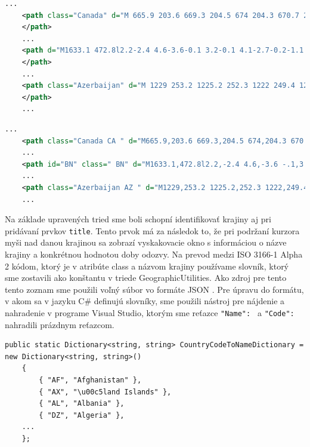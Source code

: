 \begin{lstlisting}[language={XML},caption={Ukážka kódu neupravenej SVG mapy.},label=alg:map_orig]
    ...
    <path class="Canada" d="M 665.9 203.6 669.3 204.5 674 204.3 670.7 206.9 668.7 207.3 663.2 204.6 662.6 202.5 665.1 200.6 665.9 203.6 Z">
    </path>
    ...
    <path d="M1633.1 472.8l2.2-2.4 4.6-3.6-0.1 3.2-0.1 4.1-2.7-0.2-1.1 2.2-2.8-3.3z" id="BN" name="Brunei Darussalam">
    </path>
    ...
    <path class="Azerbaijan" d="M 1229 253.2 1225.2 252.3 1222 249.4 1220.8 246.9 1221.8 246.8 1223.7 248.5 1226 248.5 1226.2 249.5 1229 253.2 Z">
    </path>
    ...
\end{lstlisting}

\begin{lstlisting}[language={XML},caption={Ukážka kódu upravenej SVG mapy.},label=alg:map_edited]
    ...
    <path class="Canada CA " d="M665.9,203.6 669.3,204.5 674,204.3 670.7,206.9 668.7,207.3 663.2,204.6 662.6,202.5 665.1,200.6 665.9,203.6Z"/>
    ...
    <path id="BN" class=" BN" d="M1633.1,472.8l2.2,-2.4 4.6,-3.6 -.1,3.2 -.1,4.1 -2.7,-.2 -1.1,2.2 -2.8,-3.3z" name="Brunei Darussalam"/>
    ...
    <path class="Azerbaijan AZ " d="M1229,253.2 1225.2,252.3 1222,249.4 1220.8,246.9 1221.8,246.8 1223.7,248.5H1226L1226.2,249.5 1229,253.2Z"/>
    ...
\end{lstlisting}


Na základe upravených tried sme boli schopní identifikovať krajiny aj pri pridávaní prvkov \lstinline{title}. Tento prvok má za následok to, že pri podržaní 
kurzora myši nad danou krajinou sa zobrazí vyskakovacie okno s informáciou o názve krajiny a konkrétnou hodnotou doby odozvy. Na prevod medzi ISO 3166-1 Alpha 2 kódom, 
ktorý je v atribúte class a názvom krajiny používame slovník, ktorý sme zostavili ako konštantu v triede GeographicUtilities. Ako zdroj pre tento tento zoznam 
sme použili voľný súbor vo formáte JSON \cite{country_codes}. Pre úpravu do formátu, v akom sa v jazyku C\# definujú slovníky, sme použili nástroj pre nájdenie 
a nahradenie v programe Visual Studio, ktorým sme reťazce \lstinline{"Name": } a \lstinline{"Code": } nahradili prázdnym reťazcom. 

\begin{lstlisting}[language={[Sharp]C},caption={Ukážka kódu CountryCodeToNameDictionary},label=alg:country_code_to_country_dict]
    public static Dictionary<string, string> CountryCodeToNameDictionary = new Dictionary<string, string>()
    {
        { "AF", "Afghanistan" },
        { "AX", "\u00c5land Islands" },
        { "AL", "Albania" },
        { "DZ", "Algeria" },
    ...
    };
\end{lstlisting}

